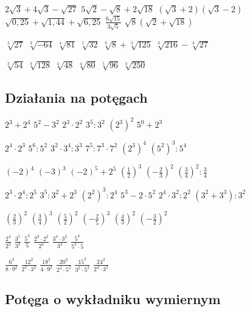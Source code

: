 \documentclass[12pt,a4paper]{article}
\begin{document}
	{$2\sqrt{3}+4\sqrt{3}-\sqrt{27}$}
	{$5\sqrt{2}-\sqrt{8}+2\sqrt{18}$}
	{$(\sqrt{3}+2)(\sqrt{3}-2)$}
	{$\sqrt{0,25}+\sqrt{1,44}+\sqrt{6,25}$}
	{$\frac{6\sqrt{15}}{3\sqrt{5}}$}
	{$\sqrt{8}\left(\sqrt{2}+\sqrt{18}\right)$}
	
	
	{$\sqrt[3]{27}$}
	{$\sqrt[3]{-64}$}
	{$\sqrt[4]{81}$}
	{$\sqrt[5]{32}$}
	{$\sqrt[3]{8}+\sqrt[3]{125}$}
	{$\sqrt[3]{216}-\sqrt[3]{27}$}
	
	{$\sqrt[3]{54}$}
	{$\sqrt[3]{128}$}
	{$\sqrt[4]{48}$}
	{$\sqrt[4]{80}$}
	{$\sqrt[5]{96}$}
	{$\sqrt[3]{250}$}
	
	\subsection{Działania na potęgach}\:
	
	{$2^3+2^4$}
	{$5^2-3^2$}
	{$2^3\cdot2^2$}
	{$3^5:3^2$}
	{$(2^3)^2$}
	{$5^0+2^3$}
	
	{$2^4\cdot2^3$}
	{$5^6:5^2$}
	{$3^2\cdot3^4:3^3$}
	{$7^5:7^3\cdot7^2$}
	{$(2^3)^4$}
	{$(5^2)^3:5^4$}
	
	{$(-2)^4$}
	{$(-3)^3$}
	{$(-2)^5+2^5$}
	{$\left(\frac{1}{2}\right)^3$}
	{$\left(-\frac{2}{3}\right)^2$}
	{$\left(\frac{3}{4}\right)^2:\frac{3}{4}$}
	
	{$2^3\cdot2^4:2^5$}
	{$3^5:3^2+2^3$}
	{$(2^2)^3:2^4$}
	{$5^3-2\cdot5^2$}
	{$2^4\cdot3^2:2^2$}
	{$(3^2+3^3):3^2$}
	
	{$\left(\frac{2}{3}\right)^2$}
	{$\left(\frac{3}{4}\right)^3$}
	{$\left(\frac{5}{2}\right)^2$}
	{$\left(-\frac{2}{5}\right)^3$}
	{$\left(\frac{4}{3}\right)^2$}
	{$\left(-\frac{3}{2}\right)^2$}
	
	{$\frac{2^4}{2^2}$}
	{$\frac{3^5}{3^2}$}
	{$\frac{5^3}{5}$}
	{$\frac{2^3\cdot2^2}{2^4}$}
	{$\frac{3^4\cdot3^2}{3^3}$}
	{$\frac{5^4}{5^2\cdot5}$}
	
	{$\frac{6^3}{8\cdot9^2}$}
	{$\frac{12^2}{2^3\cdot3^2}$}
	{$\frac{18^2}{4\cdot9^2}$}
	{$\frac{20^2}{2^3\cdot5^2}$}
	{$\frac{15^3}{3^2\cdot5^2}$}
	{$\frac{24^2}{2^4\cdot3^2}$}
	
	\subsection{Potęga o wykładniku wymiernym}\:
	
\end{document}

